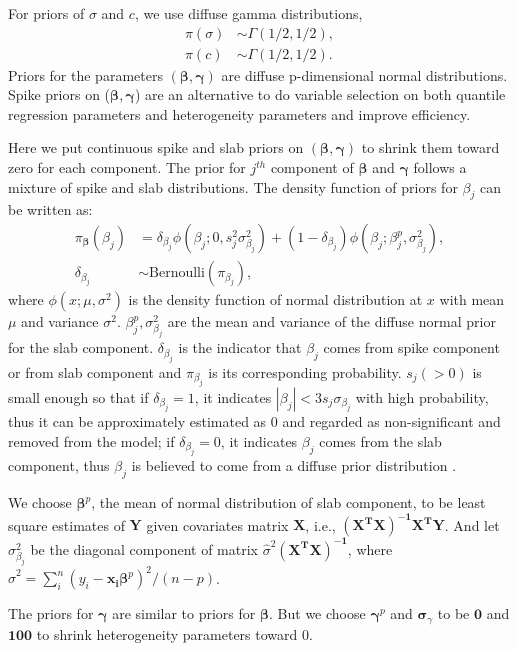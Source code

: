 \documentclass[12pt]{article}
\begin{document}
For priors of $\sigma$ and $c$, we use diffuse gamma distributions,
\begin{align*}
  \pi(\sigma) & \sim \Gamma (1/2, 1/2), \\
  \pi(c) & \sim \Gamma(1/2, 1/2).
\end{align*}
Priors for the parameters $(\bm{\beta}, \bm{\gamma})$ are diffuse
p-dimensional normal distributions.  Spike priors on ($\bm \beta,
\bm \gamma$) are an alternative to do variable selection on both
quantile regression parameters and heterogeneity parameters and
improve efficiency.

Here we put continuous spike and slab priors on $(\bm \beta, \bm
\gamma)$ to shrink them toward zero for each component. The prior for
$j^{th}$ component of $\bm \beta$ and $\bm \gamma$ follows a mixture
of spike and slab distributions.  The density function of priors for
$\beta_j$ can be written as:
\begin{align*}
  \pi_{\bm \beta} (\beta_j) &= \delta_{\beta_j} \phi(\beta_j; 0, s_j^2
  \sigma_{\beta_j}^2) +
  (1- \delta_{\beta_j}) \phi(\beta_j; \beta_j^p, \sigma_{\beta_j}^2),\\
  \delta_{\beta_j} & \sim \mbox{Bernoulli} (\pi_{\beta_j}),
\end{align*}
where $\phi(x; \mu, \sigma^2)$ is the density function of normal
distribution at $x$ with mean $\mu$ and variance
$\sigma^2$. $\beta_j^p, \sigma_{\beta_j}^2$ are the mean and variance
of the diffuse normal prior for the slab component.
$\delta_{\beta_j}$ is the indicator that $\beta_j$ comes from spike
component or from slab component and $\pi_{\beta_j}$ is its corresponding
probability.  $s_j (>0)$ is small enough so that if $\delta_{\beta_j}
= 1$, it indicates $|\beta_j | < 3 s_j\sigma_{\beta_j}$ with high
probability, thus it can be approximately estimated as 0 and regarded
as non-significant and removed from the model; if $\delta_{\beta_j} =
0$, it indicates $\beta_j$ comes from the slab component, thus
$\beta_j$ is believed to come from a diffuse prior distribution
\citep{george1993}.

We choose $\bm \beta^p$, the mean of normal distribution of slab
component, to be least square estimates of $\bm Y$ given covariates
matrix $\bm X$, i.e., $\bm{(X^TX)^{-1}X^TY}$. And let
$\sigma_{\beta_j}^2$ be the diagonal component of matrix
$\hat{\sigma}^2 \bm{(X^TX)^{-1}}$, where $\hat{\sigma}^2 = \sum_i^n
(y_i - \bm{x_i\beta}^p)^2/(n - p)$.

The priors for $\bm \gamma$ are similar to priors for $\bm \beta$. But
we choose $\bm \gamma^p$ and $\bm \sigma_{\gamma}$ to be $\bm 0$ and
$\bm{100}$ to shrink heterogeneity parameters toward 0.
\end{document}
